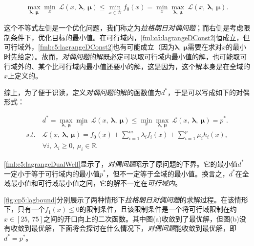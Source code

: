 \begin{equation}\label{fml:c5:lagrangeDual}
	\begin{aligned}
		\max\limits_{\bm{\lambda},~\bm{\mu}}\min_{x}~\mathcal{L}(x,~\bm{\lambda},~\bm{\mu}) \leqslant \min\limits_{x \in \mathcal{D}} f_0(x) = \min_x\max\limits_{\bm{\lambda},~\bm{\mu}}~\mathcal{L}(x,~\bm{\lambda},~\bm{\mu}).
	\end{aligned}
\end{equation}

这个不等式左侧是一个优化问题，我们称之为\emph{拉格朗日对偶问题}；而右侧是考虑限制条件下，优化目标的最小值。在可行域内，\eqref{fml:c5:lagrangeDConst2}恒成立，但可行域外，\eqref{fml:c5:lagrangeDConst2}也有可能成立（因为$\bm{\lambda},~\bm{\mu}$需要在求对$x$的最小时先给定）。故而，\emph{对偶问题}的解既必定可以取可行域内最小值的解，也可能取可行域外的、某个比可行域内最小值还要小的解，这是因为，这个解本身是在全域的$x$上定义的。

综上，为了便于识读，定义\emph{对偶问题}的解的函数值为$d^{\ast}$，于是可以写成如下的对偶形式：

\begin{problem}[拉格朗日对偶问题] \label{def:c5:lagrangeDual}
	\begin{subequations}
		\renewcommand{\theequation}
		{\theparentequation-\arabic{equation}}
		\begin{align}
			&d^{\ast} = \max\limits_{\bm{\lambda},~\bm{\mu}}\min_{x}~\mathcal{L}(x,~\bm{\lambda},~\bm{\mu}) \leqslant \min_x\max\limits_{\bm{\lambda},~\bm{\mu}}~\mathcal{L}(x,~\bm{\lambda},~\bm{\mu}) = p^{\ast}. \label{fml:c5:lagrangeDualWell}\\
			s.t.~&\mathcal{L}(x,~\bm{\lambda},~\bm{\mu})=f_0(x)+\sum\limits_{i=1}^{m}{\lambda_i f_i(x)}+\sum\limits_{i=1}^{p}{\mu_i h_i(x)}, \label{fml:c5:lagrangeDualFunc}\\
			&\forall i,~\lambda_i \geqslant 0,~\mu_i \in \mathbb{R}.\label{fml:c5:lagrangeDualFuncConst}
		\end{align}
	\end{subequations}
\end{problem}

\eqref{fml:c5:lagrangeDualWell}显示了，\emph{对偶问题}昭示了原问题的下界。它的最小值$d^{\ast}$一定小于等于可行域内的最小值$p^{\ast}$，但不一定等于全域的最小值。换言之，$d^{\ast}$在全域最小值和可行域最小值之间，它的解不一定在\emph{可行域内}。

\autoref{fig:cp5:lagbound}分别展示了两种情形下\emph{拉格朗日对偶问题}的求解过程。在该情形下，只有一个$f_1(x) \leqslant 0$的限制条件，且该限制条件是一个将可行域限制在约$x\in[25,~75]$之间的开口向上的二次函数。其中图(a)收敛到了最优解，但图(b)没有收敛到最优解，下面将会探讨在什么情况下，\emph{对偶问题}能收敛到最优解，即$d^{\ast}=p^{\ast}$。

